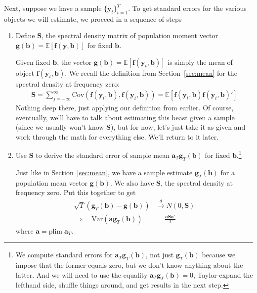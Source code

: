 \documentclass[12pt]{article}
\theoremstyle{plain}
\theoremstyle{definition}
\theoremstyle{remark}
\begin{document}
Next, suppose we have a sample $\{\boldsymbol{y}_t\}^T_{t=1}$. To get
standard errors for the various objects we will estimate, we proceed in
a sequence of steps
\begin{enumerate}
  \item Define $\boldsymbol{S}$, the spectral density matrix of
    population moment vector
    $\boldsymbol{g}(
    \boldsymbol{b})=\mathbb{E}[\boldsymbol{f}(\boldsymbol{y},
    \boldsymbol{b})]$ for fixed $\boldsymbol{b}$.

    Given fixed $\boldsymbol{b}$, the vector
    $\boldsymbol{g}(\boldsymbol{b})
    =\mathbb{E}[\boldsymbol{f}(\boldsymbol{y}_t,\boldsymbol{b})]$
    is simply the mean of object
    $\boldsymbol{f}(\boldsymbol{y}_t,\boldsymbol{b})$.
    We recall the definition from Section~\ref{sec:mean} for
    the spectral density at frequency zero:
    \begin{align*}
      \boldsymbol{S} = \sum^\infty_{j={-\infty}}
        \text{Cov}(\boldsymbol{f}(\boldsymbol{y}_t,\boldsymbol{b}),
          \boldsymbol{f}(\boldsymbol{y}_t,\boldsymbol{b}))
        =
        \mathbb{E}\left[
        \boldsymbol{f}(\boldsymbol{y}_t,\boldsymbol{b})
        \boldsymbol{f}(\boldsymbol{y}_t,\boldsymbol{b})'
        \right]
    \end{align*}
    Nothing deep there, just applying our definition from earlier. Of
    course, eventually, we'll have to talk about estimating this beast
    given a sample (since we usually won't know $\boldsymbol{S}$), but
    for now, let's just take it as given and work through the math for
    everything else. We'll return to it later.

  \item Use $\boldsymbol{S}$ to derive the standard error of sample mean
    $\boldsymbol{a}_T\boldsymbol{g}_T(\boldsymbol{b})$ for fixed
    $\boldsymbol{b}$.\footnote{We compute standard errors for
      $\boldsymbol{a}_T\boldsymbol{g}_T(\boldsymbol{b})$, not just
      $\boldsymbol{g}_T(\boldsymbol{b})$ because we impose that the
      former equals zero, but we don't know anything about the latter.
      And we will need to use the equality
      $\boldsymbol{a}_T\boldsymbol{g}_T(\boldsymbol{b})=0$,
      Taylor-expand the lefthand side, shuffle things around, and get
      results in the next step.}

    Just like in Section~\ref{sec:mean}, we have a sample estimate
    $\boldsymbol{g}_T(\boldsymbol{b})$ for a population mean vector
    $\boldsymbol{g}(\boldsymbol{b})$. We also have $\boldsymbol{S}$, the
    spectral density at frequency zero. Put this together to get
    \begin{align*}
      \sqrt{T}\left(\boldsymbol{g}_T(\boldsymbol{b})
      - \boldsymbol{g}(\boldsymbol{b})\right)
      &\xrightarrow{d} N(0,\boldsymbol{S})\\
      \Rightarrow \quad
      \text{Var}\left(
        \boldsymbol{a}
        \boldsymbol{g}_T(\boldsymbol{b})
      \right)
      &=
      \frac{\boldsymbol{a}\boldsymbol{S}\boldsymbol{a}'}{T}
    \end{align*}
    where $\boldsymbol{a}= \text{plim}\;\boldsymbol{a}_T$.


\end{enumerate}
\end{document}
